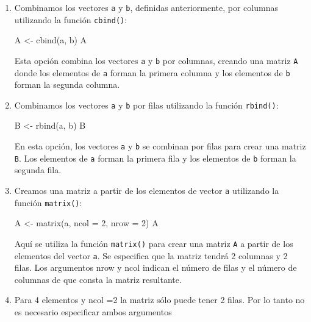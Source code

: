 \documentclass[
  jou,
  floatsintext,
  longtable,
  a4paper,
  nolmodern,
  notxfonts,
  notimes,
  12pt,
  colorlinks=true,linkcolor=blue,citecolor=blue,urlcolor=blue]{apa7}
\newenvironment{Shaded}{\begin{snugshade}}{\end{snugshade}}
\newcommand{\AttributeTok}[1]{\textcolor[rgb]{0.40,0.45,0.13}{#1}}
\newcommand{\DecValTok}[1]{\textcolor[rgb]{0.68,0.00,0.00}{#1}}
\newcommand{\FunctionTok}[1]{\textcolor[rgb]{0.28,0.35,0.67}{#1}}
\newcommand{\NormalTok}[1]{\textcolor[rgb]{0.00,0.23,0.31}{#1}}
\newcommand{\OtherTok}[1]{\textcolor[rgb]{0.00,0.23,0.31}{#1}}
\begin{document}
\begin{enumerate}
\def\labelenumi{\arabic{enumi}.}
\item
  Combinamos los vectores \texttt{a} y \texttt{b}, definidas
  anteriormente, por columnas utilizando la función \texttt{cbind()}:

\begin{Shaded}
\begin{Highlighting}[]
\NormalTok{A }\OtherTok{\textless{}{-}} \FunctionTok{cbind}\NormalTok{(a, b)}
\NormalTok{A}
\end{Highlighting}
\end{Shaded}

  Esta opción combina los vectores \texttt{a} y \texttt{b} por columnas,
  creando una matriz \texttt{A} donde los elementos de \texttt{a} forman
  la primera columna y los elementos de \texttt{b} forman la segunda
  columna.
\item
  Combinamos los vectores \texttt{a} y \texttt{b} por filas utilizando
  la función \texttt{rbind()}:

\begin{Shaded}
\begin{Highlighting}[]
\NormalTok{B }\OtherTok{\textless{}{-}} \FunctionTok{rbind}\NormalTok{(a, b)}
\NormalTok{B}
\end{Highlighting}
\end{Shaded}

  En esta opción, los vectores \texttt{a} y \texttt{b} se combinan por
  filas para crear una matriz \texttt{B}. Los elementos de \texttt{a}
  forman la primera fila y los elementos de \texttt{b} forman la segunda
  fila.
\item
  Creamos una matriz a partir de los elementos de vector \texttt{a}
  utilizando la función \texttt{matrix()}:

\begin{Shaded}
\begin{Highlighting}[]
\NormalTok{A }\OtherTok{\textless{}{-}} \FunctionTok{matrix}\NormalTok{(a, }\AttributeTok{ncol =} \DecValTok{2}\NormalTok{, }\AttributeTok{nrow =} \DecValTok{2}\NormalTok{)}
\NormalTok{A}
\end{Highlighting}
\end{Shaded}

  Aquí se utiliza la función \texttt{matrix()} para crear una matriz
  \texttt{A} a partir de los elementos del vector \texttt{a}. Se
  especifica que la matriz tendrá 2 columnas y 2 filas. Los argumentos
  nrow y ncol indican el número de filas y el número de columnas de que
  consta la matriz resultante.
\item
  Para 4 elementos y ncol =2 la matriz sólo puede tener 2 filas. Por lo
  tanto no es necesario especificar ambos argumentos


\end{enumerate}
\end{document}
